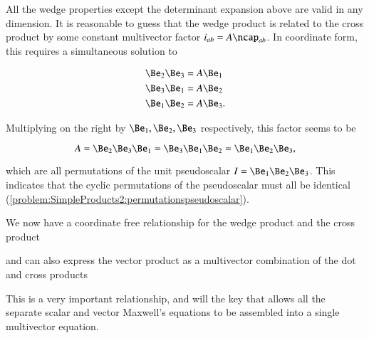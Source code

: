 All the wedge properties except the determinant expansion above are valid in any dimension.
It is reasonable to guess that the  wedge product is related to the cross product by some constant multivector factor \( i_{ab} = A \ncap_{ab} \).
In coordinate form, this requires a simultaneous solution to

\begin{dmath}\label{eqn:SimpleProducts2:1580}
\begin{aligned}
\Be_2 \Be_3 &= A \Be_1 \\
\Be_3 \Be_1 &= A \Be_2 \\
\Be_1 \Be_2 &= A \Be_3.
\end{aligned}
\end{dmath}

Multiplying on the right by \( \Be_1, \Be_2, \Be_3 \) respectively, this factor seems to be

\begin{equation}\label{eqn:SimpleProducts2:1600}
A = \Be_2 \Be_3 \Be_1 = \Be_3 \Be_1 \Be_2 = \Be_1 \Be_2 \Be_3,
\end{equation}

which are all permutations of the  unit pseudoscalar \( I = \Be_1 \Be_2 \Be_3 \).
This indicates that the cyclic permutations of the  pseudoscalar must all be identical (\cref{problem:SimpleProducts2:permutationspseudoscalar}).

We now have a coordinate free relationship for the  wedge product and the cross product


and can also express the
 vector product as a multivector combination of the dot and cross products


This is a very important relationship, and will the key that allows
all the separate scalar and vector Maxwell's equations to be assembled into a single multivector equation.




